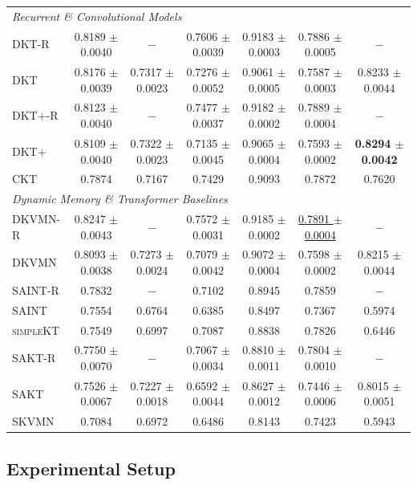 \documentclass[11pt]{article}
\begin{document}
\begin{table}[t]
\begin{tabular}{lcccccc}
\midrule
\multicolumn{7}{l}{\emph{Recurrent \& Convolutional Models}} \\
\textsc{DKT-R} & 0.8189 $\pm$ 0.0040 & $-$ & 0.7606 $\pm$ 0.0039 & 0.9183 $\pm$ 0.0003 & 0.7886 $\pm$ 0.0005 & $-$ \\
\textsc{DKT} & 0.8176 $\pm$ 0.0039 & 0.7317 $\pm$ 0.0023 & 0.7276 $\pm$ 0.0052 & 0.9061 $\pm$ 0.0005 & 0.7587 $\pm$ 0.0003 & 0.8233 $\pm$ 0.0044 \\
\textsc{DKT+-R} & 0.8123 $\pm$ 0.0040 & $-$ & 0.7477 $\pm$ 0.0037 & 0.9182 $\pm$ 0.0002 & 0.7889 $\pm$ 0.0004 & $-$ \\
\textsc{DKT+} & 0.8109 $\pm$ 0.0040 & 0.7322 $\pm$ 0.0023 & 0.7135 $\pm$ 0.0045 & 0.9065 $\pm$ 0.0004 & 0.7593 $\pm$ 0.0002 & \textbf{0.8294 $\pm$ 0.0042} \\
\textsc{CKT} & 0.7874 & 0.7167 & 0.7429 & 0.9093 & 0.7872 & 0.7620 \\
\midrule
\multicolumn{7}{l}{\emph{Dynamic Memory \& Transformer Baselines}} \\
\textsc{DKVMN-R} & 0.8247 $\pm$ 0.0043 & $-$ & 0.7572 $\pm$ 0.0031 & 0.9185 $\pm$ 0.0002 & \underline{0.7891 $\pm$ 0.0004} & $-$ \\
\textsc{DKVMN} & 0.8093 $\pm$ 0.0038 & 0.7273 $\pm$ 0.0024 & 0.7079 $\pm$ 0.0042 & 0.9072 $\pm$ 0.0004 & 0.7598 $\pm$ 0.0002 & 0.8215 $\pm$ 0.0044 \\
\textsc{SAINT-R} & 0.7832 & $-$ & 0.7102 & 0.8945 & 0.7859 & $-$ \\
\textsc{SAINT} & 0.7554 & 0.6764 & 0.6385 & 0.8497 & 0.7367 & 0.5974 \\
\textsc{simpleKT} & 0.7549 & 0.6997 & 0.7087 & 0.8838 & 0.7826 & 0.6446 \\
\textsc{SAKT-R} & 0.7750 $\pm$ 0.0070 & $-$ & 0.7067 $\pm$ 0.0034 & 0.8810 $\pm$ 0.0011 & 0.7804 $\pm$ 0.0010 & $-$ \\
\textsc{SAKT} & 0.7526 $\pm$ 0.0067 & 0.7227 $\pm$ 0.0018 & 0.6592 $\pm$ 0.0044 & 0.8627 $\pm$ 0.0012 & 0.7446 $\pm$ 0.0006 & 0.8015 $\pm$ 0.0051 \\
\textsc{SKVMN} & 0.7084 & 0.6972 & 0.6486 & 0.8143 & 0.7423 & 0.5943 \\
\bottomrule
\end{tabular}
\end{table}

\subsection{Experimental Setup}
\label{sec:exp_setup}
\end{document}

